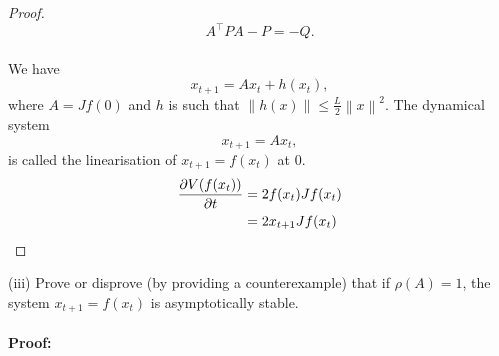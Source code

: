 \documentclass[a4paper,11pt,reqno]{amsart}
\newcommand{\tran}{\intercal}
\begin{document}
\begin{proof}
\begin{equation}
    A^{\tran}PA-P=-Q.
\end{equation}
\\
We have
\begin{equation}
    x_{t+1}=Ax_t+h(x_t),
\end{equation}
where $A=Jf(0)$ and $h$ is such that $\left\lVert h(x)\right\rVert \leq \tfrac{L}{2}\left\lVert x\right\rVert ^2$. The dynamical system
\begin{equation}
    x_{t+1}=Ax_t,
\end{equation}
is called the linearisation of $x_{t+1}=f(x_t)$ at 0.
\begin{align}
    \frac{\partial V(f(x_t))}{\partial t}&=2f(x_t)Jf(x_t)
    \notag\\
    &=2x_{t+1}Jf(x_t)
\end{align}
\end{proof}
(iii) Prove or disprove (by providing a counterexample) that if $\rho(A)=1$, the system $x_{t+1}=f(x_t)$ is asymptotically stable.
\\ \\
\textbf{Proof:} 
\\ \\
\end{document}
